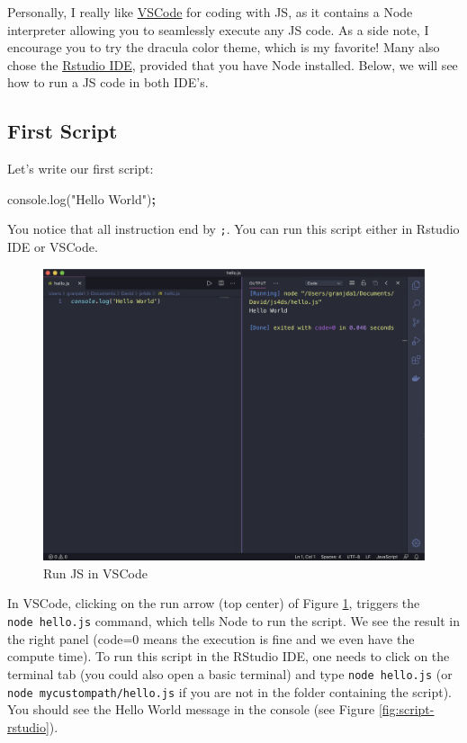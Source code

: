 \documentclass[
]{book}
\newenvironment{Shaded}{\begin{snugshade}}{\end{snugshade}}
\newcommand{\AttributeTok}[1]{\textcolor[rgb]{0.77,0.63,0.00}{#1}}
\newcommand{\NormalTok}[1]{#1}
\newcommand{\OperatorTok}[1]{\textcolor[rgb]{0.81,0.36,0.00}{\textbf{#1}}}
\newcommand{\StringTok}[1]{\textcolor[rgb]{0.31,0.60,0.02}{#1}}
\newcommand{\VariableTok}[1]{\textcolor[rgb]{0.00,0.00,0.00}{#1}}
\begin{document}
Personally, I really like \href{https://code.visualstudio.com}{VSCode} for coding with JS, as it contains a Node interpreter allowing you to seamlessly execute any JS code. As a side note, I encourage you to try the dracula color theme, which is my favorite! Many also chose the \href{https://rstudio.com/products/rstudio/}{Rstudio IDE}, provided that you have Node installed. Below, we will see how to run a JS code in both IDE's.

\hypertarget{first-script}{%
\subsection{First Script}\label{first-script}}

Let's write our first script:

\begin{Shaded}
\begin{Highlighting}[]
\VariableTok{console}\NormalTok{.}\AttributeTok{log}\NormalTok{(}\StringTok{"Hello World"}\NormalTok{)}\OperatorTok{;}
\end{Highlighting}
\end{Shaded}

You notice that all instruction end by \texttt{;}. You can run this script either in Rstudio IDE or VSCode.

\begin{figure}
\includegraphics[width=29.61in]{images/survival-kit/script-vscode} \caption{Run JS in VSCode}\label{fig:script-vscode}
\end{figure}

In VSCode, clicking on the run arrow (top center) of Figure \ref{fig:script-vscode}, triggers the \texttt{node\ hello.js} command, which tells Node to run the script. We see the result in the right panel (code=0 means the execution is fine and we even have the compute time). To run this script in the RStudio IDE, one needs to click on the terminal tab (you could also open a basic terminal) and type \texttt{node\ hello.js} (or \texttt{node\ mycustompath/hello.js} if you are not in the folder containing the script). You should see the Hello World message in the console (see Figure \ref{fig:script-rstudio}).
\end{document}
